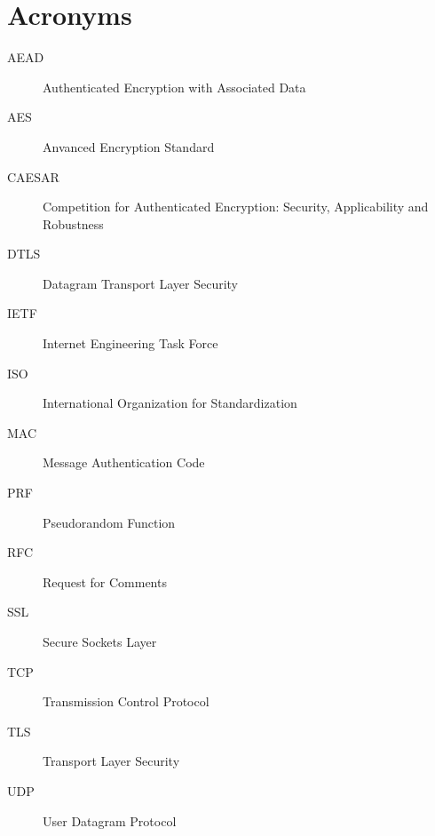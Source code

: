 \chapter{Acronyms}

\begin{description}
  \item[AEAD] Authenticated Encryption with Associated Data
  \item[AES] Anvanced Encryption Standard
  \item[CAESAR] Competition for Authenticated Encryption: Security, Applicability and Robustness
  \item[DTLS] Datagram Transport Layer Security
  \item[IETF] Internet Engineering Task Force
  \item[ISO] International Organization for Standardization
  \item[MAC] Message Authentication Code
  \item[PRF] Pseudorandom Function
  \item[RFC] Request for Comments
  \item[SSL] Secure Sockets Layer
  \item[TCP] Transmission Control Protocol
  \item[TLS] Transport Layer Security
  \item[UDP] User Datagram Protocol
\end{description}
